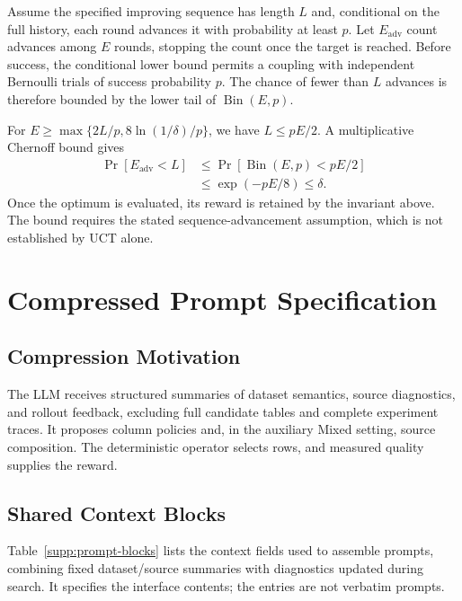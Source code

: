 \documentclass[conference]{IEEEtran}
\begin{document}
\begin{IEEEproof}
Assume the specified improving sequence has length $L$ and, conditional on the full history, each round advances it with probability at least $p$. Let $E_{\mathrm{adv}}$ count advances among $E$ rounds, stopping the count once the target is reached. Before success, the conditional lower bound permits a coupling with independent Bernoulli trials of success probability $p$. The chance of fewer than $L$ advances is therefore bounded by the lower tail of $\operatorname{Bin}(E,p)$.

For $E\ge\max\{2L/p,8\ln(1/\delta)/p\}$, we have $L\le pE/2$. A multiplicative Chernoff bound gives
\[
\begin{split}
\Pr[E_{\mathrm{adv}}<L]
&\le\Pr[\operatorname{Bin}(E,p)<pE/2]\\
&\le\exp(-pE/8)\le\delta.
\end{split}
\]
Once the optimum is evaluated, its reward is retained by the invariant above. The bound requires the stated sequence-advancement assumption, which is not established by UCT alone.
\end{IEEEproof}

\onecolumn
\section{Compressed Prompt Specification}
\label{supp:prompts}
\subsection{Compression Motivation}
The LLM receives structured summaries of dataset semantics, source diagnostics, and rollout feedback, excluding full candidate tables and complete experiment traces. It proposes column policies and, in the auxiliary Mixed setting, source composition. The deterministic operator selects rows, and measured quality supplies the reward.

\subsection{Shared Context Blocks}
Table~\ref{supp:prompt-blocks} lists the context fields used to assemble prompts, combining fixed dataset/source summaries with diagnostics updated during search. It specifies the interface contents; the entries are not verbatim prompts.
\end{document}
